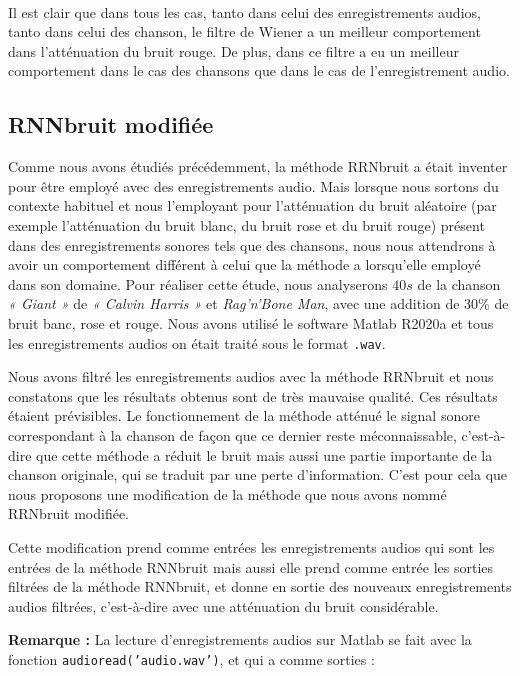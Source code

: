 \documentclass[conference,onecolumn]{IEEEtran}
\begin{document}
\hfill \\
Il est clair que dans tous les cas, tanto dans celui des enregistrements audios, tanto dans celui des chanson, le filtre de Wiener a un meilleur comportement dans l’atténuation du bruit rouge. De plus, dans ce filtre a eu un meilleur comportement dans le cas des chansons que dans le cas de l’enregistrement audio.






\subsection{\textbf{RNNbruit modifiée}}
Comme nous avons étudiés précédemment, la méthode RRNbruit a était inventer pour être employé avec des enregistrements audio. Mais lorsque nous sortons du contexte habituel et nous l’employant pour l’atténuation du bruit aléatoire (par exemple l’atténuation du bruit blanc, du bruit rose et du bruit rouge) présent dans des enregistrements sonores tels que des chansons, nous nous attendrons à avoir un comportement différent à celui que la méthode a lorsqu’elle employé dans son domaine. Pour réaliser cette étude, nous analyserons $40s$ de la chanson \textit{« Giant »} de \textit{« Calvin Harris »} et \textit{Rag'n'Bone Man}, avec une addition de 30\% de bruit banc, rose et rouge. Nous avons utilisé le software Matlab R2020a et tous les enregistrements audios on était traité sous le format \texttt{.wav}.

Nous avons filtré les enregistrements audios avec la méthode RRNbruit et nous constatons que les résultats obtenus sont de très mauvaise qualité. Ces résultats étaient prévisibles. Le fonctionnement de la méthode atténué le signal sonore correspondant à la chanson de façon que ce dernier reste méconnaissable, c’est-à-dire que cette méthode a réduit le bruit mais aussi une partie importante de la chanson originale, qui se traduit par une perte d’information. C’est pour cela que nous proposons une modification de la méthode que nous avons nommé RRNbruit modifiée.


Cette modification prend comme entrées les enregistrements audios qui sont les entrées de la méthode RNNbruit mais aussi elle prend comme entrée les sorties filtrées de la méthode RNNbruit, et donne en sortie des nouveaux enregistrements audios filtrées, c’est-à-dire avec une atténuation du bruit considérable. 

\textbf{Remarque :} La lecture d’enregistrements audios sur Matlab se fait avec la fonction \texttt{audioread('audio.wav')}, et qui a comme sorties :
\end{document}
